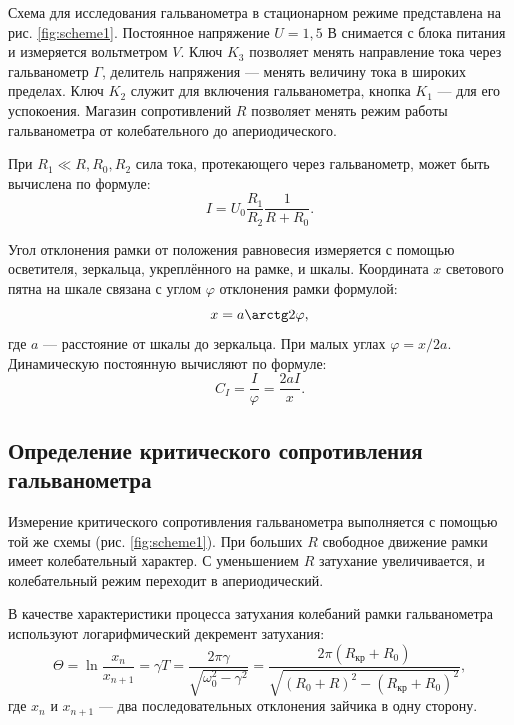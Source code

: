 \documentclass[a4paper]{article}
\begin{document}
Схема для исследования гальванометра в стационарном режиме представлена на рис. \ref{fig:scheme1}. Постоянное напряжение $U = 1,5$ В снимается с блока питания и измеряется вольтметром $V$. Ключ $K_3$ позволяет менять направление тока через гальванометр $\Gamma$, делитель напряжения --- менять величину тока в широких пределах. Ключ $K_2$ служит для включения гальванометра, кнопка $K_1$ --- для его успокоения. Магазин сопротивлений $R$ позволяет менять режим работы гальванометра от колебательного до апериодического.

При $R_1 \ll R, R_0, R_2$ сила тока, протекающего через гальванометр, может быть вычислена по формуле:
\begin{equation}
    I = U_0 \frac{R_1}{R_2} \frac{1}{R + R_0}.
    \label{eq:current}
\end{equation}

Угол отклонения рамки от положения равновесия измеряется с помощью осветителя, зеркальца, укреплённого на рамке, и шкалы. Координата $x$ светового пятна на шкале связана с углом $\varphi$ отклонения рамки формулой:
\[
x = a \arctg 2\varphi,
\]
где $a$ --- расстояние от шкалы до зеркальца. При малых углах $\varphi = x/2a$. Динамическую постоянную вычисляют по формуле:
\begin{equation}
    C_I = \frac{I}{\varphi} = \frac{2aI}{x}.
    \label{eq:dyn_const}
\end{equation}

\subsection{Определение критического сопротивления гальванометра}

Измерение критического сопротивления гальванометра выполняется с помощью той же схемы (рис. \ref{fig:scheme1}). При больших $R$ свободное движение рамки имеет колебательный характер. С уменьшением $R$ затухание увеличивается, и колебательный режим переходит в апериодический.

В качестве характеристики процесса затухания колебаний рамки гальванометра используют логарифмический декремент затухания:
\begin{equation}
    \Theta = \ln\frac{x_n}{x_{n+1}} = \gamma T = \frac{2\pi \gamma}{\sqrt{\omega_0^2 - \gamma^2}} = \frac{2\pi (R_{\text{кр}} + R_0)}{\sqrt{(R_0 + R)^2 - (R_{\text{кр}} + R_0)^2}},
    \label{eq:decrement}
\end{equation}
где $x_n$ и $x_{n+1}$ --- два последовательных отклонения зайчика в одну сторону.
\end{document}
